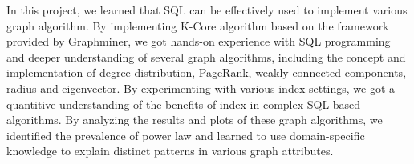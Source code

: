 \par In this project, we learned that SQL can be effectively used to implement various graph algorithm. By implementing K-Core algorithm based on the framework provided by Graphminer, we got hands-on experience with SQL programming and deeper understanding of several graph algorithms, including the concept and implementation of degree distribution, PageRank, weakly connected components, radius and eigenvector. By experimenting with various index settings, we got a quantitive understanding of the benefits of index in complex SQL-based algorithms. By analyzing the results and plots of these graph algorithms, we identified the prevalence of power law and learned to use domain-specific knowledge to explain distinct patterns in various graph attributes.